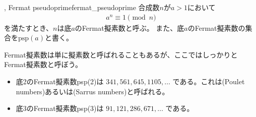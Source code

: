 \begin{Defi}{, Fermat pseudoprime}{fermat_pseudoprime}
合成数$n$が$a>1$において
\begin{align*}
a^{n} \equiv 1 \pmod{n}
\end{align*}
を満たすとき、$n$は底$a$のFermat擬素数と呼ぶ。
また、底$a$のFermat擬素数の集合を$\mbox{psp}(a)$と書く。
\end{Defi}

Fermat擬素数は単に擬素数と呼ばれることもあるが、ここではしっかりとFermat擬素数と呼ぼう。

\begin{Exam}{}{}\;
\begin{itemize}
 \item 底2のFermat擬素数psp(2)は $341, 561, 645, 1105,\ldots$ である。これは(Poulet numbers)あるいは(Sarrus numbers)と呼ばれる。
 \item 底3のFermat擬素数psp(3)は $91, 121, 286, 671,\ldots$ である。
\end{itemize}
\end{Exam}

